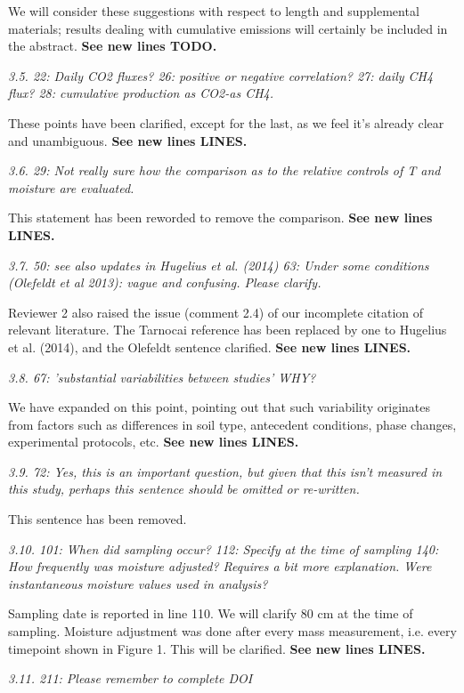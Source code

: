 \documentclass[11pt, oneside]{article}
\begin{document}
We will consider these suggestions with respect to length and supplemental materials; results dealing with cumulative emissions will certainly be included in the abstract. {\bf See new lines TODO.}

\medskip
{\it 3.5. 22: Daily CO2 fluxes?
26: positive or negative correlation?
27: daily CH4 flux?
28: cumulative production as CO2-as CH4. }

These points have been clarified, except for the last, as we feel it's already clear and unambiguous. {\bf See new lines LINES.}

\medskip
{\it 3.6. 29: Not really sure how the comparison as to the relative controls of T and moisture are evaluated. }

This statement has been reworded to remove the comparison. {\bf See new lines LINES.}

\medskip
{\it 3.7. 50: see also updates in Hugelius et al. (2014)
63: Under some conditions (Olefeldt et al 2013): vague and confusing. Please clarify. }

Reviewer 2 also raised the issue (comment 2.4) of our incomplete citation of relevant literature. The Tarnocai reference has been replaced by one to Hugelius et al. (2014), and the Olefeldt sentence clarified. {\bf See new lines LINES.}

\medskip
{\it 3.8. 67: 'substantial variabilities between studies' WHY? }

We have expanded on this point, pointing out that such variability originates from factors such as differences in soil type, antecedent conditions, phase changes, experimental protocols, etc. {\bf See new lines LINES.}

\medskip
{\it 3.9. 72: Yes, this is an important question, but given that this isn't measured in this study, perhaps this sentence should be omitted or re-written. }

This sentence has been removed.

\medskip
{\it 3.10. 101: When did sampling occur?
112: Specify at the time of sampling
140: How frequently was moisture adjusted? Requires a bit more explanation. Were instantaneous moisture values used in analysis? }

Sampling date is reported in line 110. We will clarify 80 cm at the time of sampling. Moisture adjustment was done after every mass measurement, i.e. every timepoint shown in Figure 1. This will be clarified. {\bf See new lines LINES.}

\medskip
{\it 3.11. 211: Please remember to complete DOI }
\end{document}
